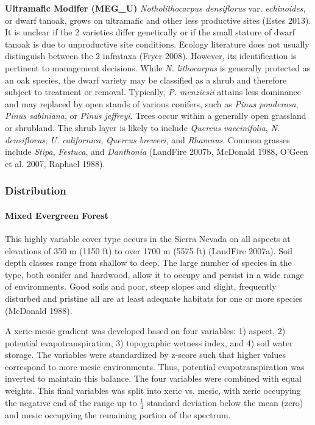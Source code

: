 \begin{adjustwidth}{2cm}{}
\medskip
\noindent \textbf{Ultramafic Modifer (MEG\_U)}
\emph{Notholithocarpus densiflorus} var. \emph{echinoides}, or dwarf tanoak, grows on ultramafic and other less productive sites (Estes 2013). It is unclear if the 2 varieties differ genetically or if the small stature of dwarf tanoak is due to unproductive site conditions. Ecology literature does not usually distinguish between the 2 infrataxa (Fryer 2008). However, its identification is pertinent to management decisions. While \emph{N. lithocarpus} is generally protected as an oak species, the dwarf variety may be classified as a shrub and therefore subject to treatment or removal. Typically, \emph{P. menziesii} attains less dominance and may replaced by open stands of various conifers, such as \emph{Pinus ponderosa}, \emph{Pinus sabiniana}, or \emph{Pinus jeffreyi}. Trees occur within a generally open grassland or shrubland. The shrub layer is likely to include \emph{Quercus vaccinifolia}, \emph{N. densiflorus}, \emph{U. californica}, \emph{Quercus breweri}, and \emph{Rhamnus}. Common grasses include \emph{Stipa}, \emph{Festuca}, and \emph{Danthonia} (LandFire 2007b, McDonald 1988, O’Geen et al. 2007, Raphael 1988). 

\end{adjustwidth}

\subsubsection{Distribution}
\paragraph{Mixed Evergreen Forest}		This highly variable cover type occurs in the Sierra Nevada on all aspects at elevations of 350 m (1150 ft) to over 1700 m (5575 ft) (LandFire 2007a). Soil depth classes range from shallow to deep. The large number of species in the type, both conifer and hardwood, allow it to occupy and persist in a wide range of environments. Good soils and poor, steep slopes and slight, frequently disturbed and pristine all are at least adequate habitats for one or more species (McDonald 1988).

A xeric-mesic gradient was developed based on four variables: 1) aspect, 2) potential evapotranspiration, 3) topographic wetness index, and 4) soil water storage. The variables were standardized by z-score such that higher values correspond to more mesic environments. Thus, potential evapotranspiration was inverted to maintain this balance. The four variables were combined with equal weights. This final variables was split into xeric vs. mesic, with xeric occupying the negative end of the range up to $\frac{1}{4}$ standard deviation below the mean (zero) and mesic occupying the remaining portion of the spectrum.

